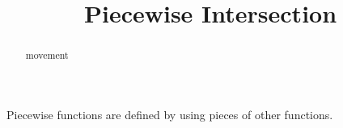 \documentclass{ximera}
\title{Piecewise Intersection}
\begin{document}
\begin{abstract}
movement
\end{abstract}
\maketitle



Piecewise functions are defined by using pieces of other functions.
\end{document}
